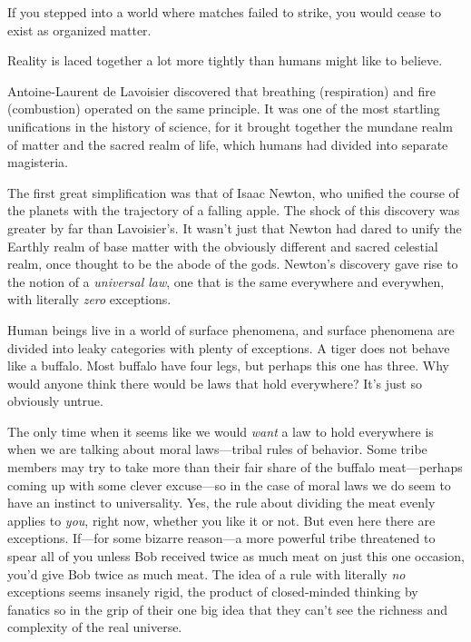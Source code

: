 {
 If you stepped into a world where matches failed to strike, you
would cease to exist as organized matter.}

{
 Reality is laced together a lot more tightly than humans might
like to believe.}

\myendsectiontext


\bigskip


{
 Antoine-Laurent de Lavoisier discovered that breathing
(respiration) and fire (combustion) operated on the same principle. It
was one of the most startling unifications in the history of science,
for it brought together the mundane realm of matter and the sacred
realm of life, which humans had divided into separate magisteria. }

{
 The first great simplification was that of Isaac Newton, who
unified the course of the planets with the trajectory of a falling
apple. The shock of this discovery was greater by far than
Lavoisier's. It wasn't just that Newton
had dared to unify the Earthly realm of base matter with the obviously
different and sacred celestial realm, once thought to be the abode of
the gods. Newton's discovery gave rise to the notion of
a \textit{universal law}, one that is the same everywhere and
everywhen, with literally \textit{zero} exceptions.}

{
 Human beings live in a world of surface phenomena, and surface
phenomena are divided into leaky categories with plenty of exceptions.
A tiger does not behave like a buffalo. Most buffalo have four legs,
but perhaps this one has three. Why would anyone think there would be
laws that hold everywhere? It's just so obviously
untrue.}

{
 The only time when it seems like we would \textit{want} a law to
hold everywhere is when we are talking about moral laws---tribal rules
of behavior. Some tribe members may try to take more than their fair
share of the buffalo meat---perhaps coming up with some clever
excuse---so in the case of moral laws we do seem to have an instinct to
universality. Yes, the rule about dividing the meat evenly applies to
\textit{you}, right now, whether you like it or not. But even here
there are exceptions. If---for some bizarre reason---a more powerful
tribe threatened to spear all of you unless Bob received twice as much
meat on just this one occasion, you'd give Bob twice as
much meat. The idea of a rule with literally \textit{no} exceptions
seems insanely rigid, the product of closed-minded thinking by fanatics
so in the grip of their one big idea that they can't
see the richness and complexity of the real universe.}

